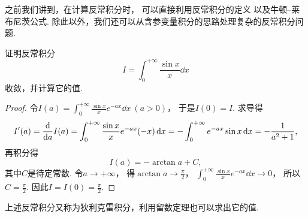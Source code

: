 之前我们讲到，在计算反常积分时，
可以直接利用反常积分的定义
以及牛顿--莱布尼茨公式.
除此以外，我们还可以从含参变量积分的思路处理复杂的反常积分问题.

\begin{example}
证明反常积分\[
I = \int_0^{+\infty} \frac{\sin x}{x} \dd{x}
\]收敛，并计算它的值.
\begin{proof}
令\(I(a) = \int_0^{+\infty} \frac{\sin x}{x} e^{-ax} \dd{x}\ (a>0)\)，
于是\(I(0) = I\).
求导得\[
	I'(a) = \dv{a} I(a)
	= \int_0^{+\infty} \frac{\sin x}{x} e^{-ax} (-x) \dd{x}
	= - \int_0^{+\infty} e^{-ax} \sin x \dd{x}
	= - \frac{1}{a^2+1},
\]
再积分得\[
	I(a) = -\arctan a + C,
\]
其中\(C\)是待定常数.
令\(a\to+\infty\)，
得\(\arctan a\to\frac{\pi}{2}\)，
\(\int_0^{+\infty} \frac{\sin x}{x} e^{-ax} \dd{x} \to 0\)，
所以\(C = \frac{\pi}{2}\).
因此\(I = I(0) = \frac{\pi}{2}\).
\end{proof}
\end{example}
上述反常积分又称为狄利克雷积分，利用留数定理也可以求出它的值.
